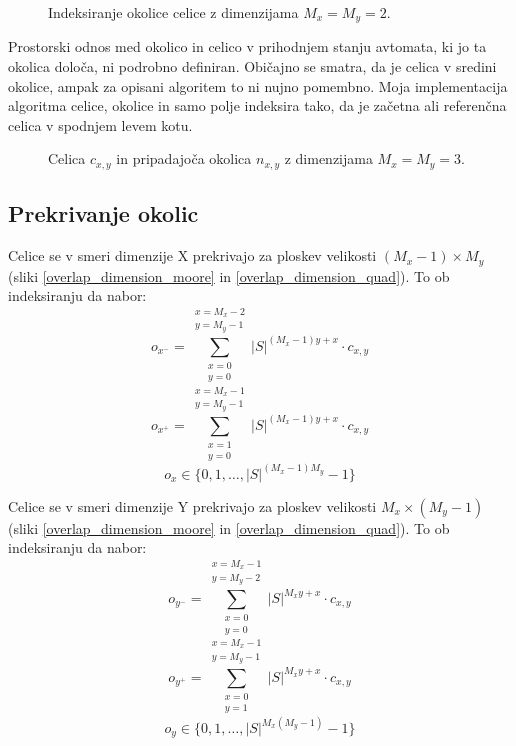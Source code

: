 \documentclass[12pt,a4paper,openany,twoside]{book}
\begin{document}
\begin{figure}[htb]
\centerline{}
\caption[Indeksiranje okolice \(2 \times 2\).]{Indeksiranje okolice celice z dimenzijama \(M_x=M_y=2\).}
\label{neighborhood_index_quad}
\end{figure}

Prostorski odnos med okolico in celico v prihodnjem stanju avtomata, ki jo ta okolica določa,
ni podrobno definiran. Običajno se smatra, da je celica v sredini okolice, ampak za opisani algoritem to ni
nujno pomembno. Moja implementacija algoritma celice, okolice in samo polje indeksira tako,
da je začetna ali referenčna celica v spodnjem levem kotu.

\begin{figure}[htb]
\centerline{}
\caption[Velikost okolice.]{Celica \(c_{x,y}\) in pripadajoča okolica \(n_{x,y}\) z dimenzijama \(M_x=M_y=3\).}
\label{neighborhood}
\end{figure}


\subsection{Prekrivanje okolic}

Celice se v smeri dimenzije X prekrivajo za ploskev velikosti \((M_x-1) \times M_y\) (sliki \ref{overlap_dimension_moore} in \ref{overlap_dimension_quad}).
To ob indeksiranju da nabor:
\begin{equation}
o_{x^-} = \sum_{\substack{x=0 \\ y=0}}^{\substack{x=M_x-2 \\ y=M_y-1}} |S|^{(M_x-1) y + x} \cdot c_{x,y}
\end{equation}
\begin{equation}
o_{x^+} = \sum_{\substack{x=1 \\ y=0}}^{\substack{x=M_x-1 \\ y=M_y-1}} |S|^{(M_x-1) y + x} \cdot c_{x,y}
\end{equation}
\begin{equation}
o_x \in \{0, 1, \ldots, |S|^{(M_x-1)M_y}-1\}
\end{equation}

Celice se v smeri dimenzije Y prekrivajo za ploskev velikosti \(M_x \times (M_y-1)\) (sliki \ref{overlap_dimension_moore} in \ref{overlap_dimension_quad}).
To ob indeksiranju da nabor:
\begin{equation}
o_{y^-} = \sum_{\substack{x=0 \\ y=0}}^{\substack{x=M_x-1 \\ y=M_y-2}} |S|^{M_x y + x} \cdot c_{x,y}
\end{equation}
\begin{equation}
o_{y^+} = \sum_{\substack{x=0 \\ y=1}}^{\substack{x=M_x-1 \\ y=M_y-1}} |S|^{M_x y + x} \cdot c_{x,y}
\end{equation}
\begin{equation}
o_y \in \{0, 1, \ldots, |S|^{M_x(M_y-1)}-1\}
\end{equation}
\end{document}
